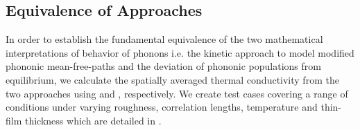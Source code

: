 \subsection{Equivalence of Approaches}
In order to establish the fundamental equivalence of the two mathematical interpretations of behavior of phonons i.e. the kinetic approach to model modified phononic mean-free-paths and the deviation of phononic populations from equilibrium, we calculate the spatially averaged thermal conductivity from the two approaches using  and , respectively. We create test cases covering a range of conditions under varying roughness, correlation lengths, temperature and thin-film thickness which are detailed in . 
\\
\begin{table}[hbt]
\centering
\caption{Test cases to examine the equivalence between reduced mean-free-path approach and deviation of population from equilibrium approach.}
\end{table}
